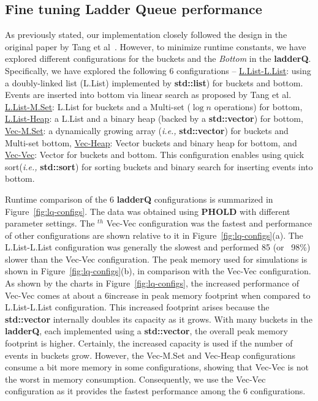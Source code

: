 \subsection{Fine tuning Ladder Queue performance}\label{sec:fine-tune-lq}

As previously stated, our implementation closely followed the design in the original paper by Tang et al~\cite{tang-05}. However, to minimize runtime constants, we have explored different configurations for the buckets and the \emph{Bottom} in the \textbf{ladderQ}. Specifically, we have explored the
following 6 configurations --  \underline{L.List-L.List}: using a doubly-linked list (L.List) implemented by \textbf{std::list}) for buckets and bottom. Events are inserted into bottom via linear search as proposed by Tang et al.  \underline{L.List-M.Set}: L.List for buckets and a Multi-set ($\log n$ operations) for bottom,  \underline{L.List-Heap}: a L.List and a binary heap (backed by a \textbf{std::vector}) for bottom,  \underline{Vec-M.Set}: a dynamically growing array (\textit{i.e.,} \textbf{std::vector}) for buckets and Multi-set bottom,  \underline{Vec-Heap}: Vector buckets and binary heap for bottom, and  \underline{Vec-Vec}: Vector for buckets and bottom. This configuration enables using quick sort(\textit{i.e.,} \textbf{std::sort}) for sorting buckets and binary search for inserting events into bottom.

Runtime comparison of the 6 \textbf{ladderQ} configurations is summarized in Figure~\ref{fig:lq-configs}. The data was obtained using \textbf{PHOLD} with different parameter settings. The $^{th}$ Vec-Vec configuration was the fastest and performance of other configurations are shown relative to it in Figure~\ref{fig:lq-configs}(a). The L.List-L.List configuration was generally the slowest and performed 85 \texttimes (or ~98\%) slower than the Vec-Vec configuration. The peak memory used for simulations is shown in Figure~\ref{fig:lq-configs}(b), in comparison with the Vec-Vec configuration.  As shown by the charts in Figure~\ref{fig:lq-configs}, the increased performance of Vec-Vec comes at about a 6\texttimes increase in peak memory footprint when compared to L.List-L.List configuration. This increased footprint arises because the \textbf{std::vector} internally doubles its capacity as it grows. With many buckets in the \textbf{ladderQ}, each implemented using a \textbf{std::vector}, the overall peak memory footprint is higher. Certainly, the increased capacity is used if the number of events in buckets grow. However, the Vec-M.Set and Vec-Heap configurations consume a bit more memory in some configurations, showing that Vec-Vec is not the worst in memory consumption. Consequently, we use the Vec-Vec configuration as it provides the fastest performance among the 6 configurations.

